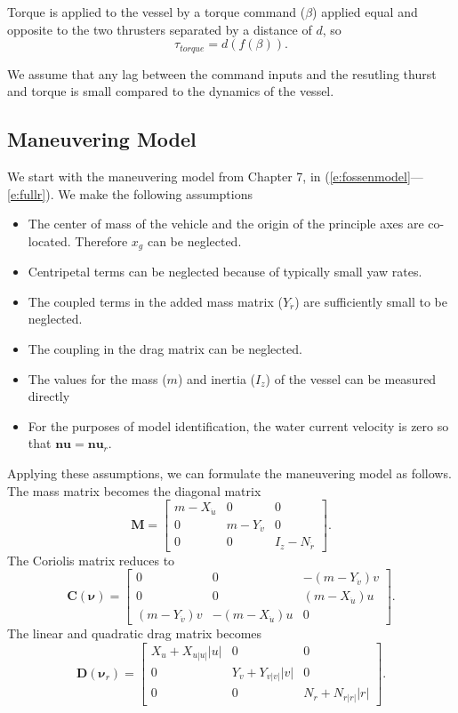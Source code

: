 \documentclass[11pt,draftcls,journal,onecolumn]{IEEEtran}
\begin{document}
Torque is applied to the vessel by a torque command ($\beta$) applied equal and opposite to the two thrusters separated by a distance of $d$, so
\begin{equation}
\tau_{torque}= d (f(\beta)).
\label{e:torque}
\end{equation}

We assume that any lag between the command inputs and the resutling thurst and torque is small compared to the dynamics of the vessel.

\subsection{Maneuvering Model}
We start with the maneuvering model from \cite{fossen11handbook} Chapter 7, in (\ref{e:fossenmodel}---\ref{e:fullr}).  We make the following assumptions
\begin{itemize}
\item The center of mass of the vehicle and the origin of the principle axes are co-located.  Therefore $x_g$ can be neglected.
\item Centripetal terms can be neglected because of typically small yaw rates.
\item The coupled terms in the added mass matrix ($Y_{\dot{r}}$) are sufficiently small to be neglected.
\item The coupling in the drag matrix can be neglected.
\item The values for the mass ($m$) and inertia ($I_z$) of the vessel can be measured directly
\item For the purposes of model identification, the water current velocity is zero so that $\bm{nu}=\bm{nu}_r$.
\end{itemize}
Applying these assumptions, we can formulate the maneuvering model as follows.  The mass matrix becomes the diagonal matrix
\begin{equation}
\bm{M}= \left[ 
\begin{array}{ccc}
m-X_{\dot{u}} & 0 & 0 \\
0 & m-Y_{\dot{v}} & 0 \\
0 & 0 & I_z-N_{\dot{r}} 
\end{array} \right].
\end{equation}
The Coriolis matrix reduces to 
\begin{equation}
\bm{C}(\bm{\nu})= \left[ 
\begin{array}{ccc}
0 & 0 & -(m-Y_{\dot{v}})v \\
0 & 0 & (m-X_{\dot{u}})u \\
(m-Y_{\dot{v}})v & -(m-X_{\dot{u}})u  & 0 
\end{array} \right].
\end{equation}
The linear and quadratic drag matrix becomes
\begin{equation}
\bm{D}(\bm{\nu}_r)= \left[ 
\begin{array}{ccc}
X_u + X_{u|u|}|u| & 0 & 0 \\
0 & Y_v + Y_{v|v|}|v| & 0 \\
0 & 0  & N_r+N_{r|r|}|r|
\end{array} \right].
\end{equation}
\end{document}
